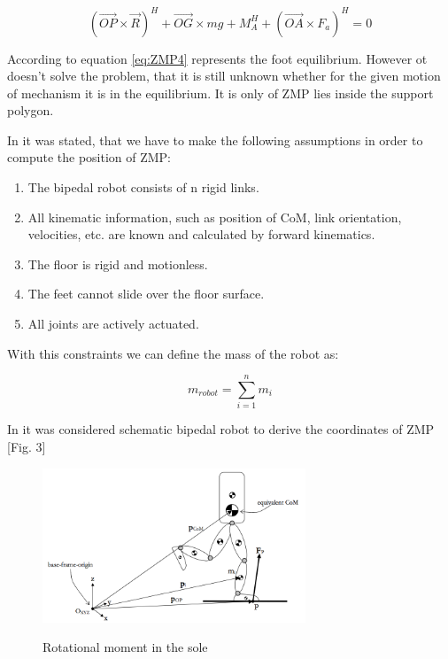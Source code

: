 \documentclass[12pt,a4paper]{report}
\begin{document}
		\begin{equation}\label{eq:ZMP4}
			(\vec{OP} \times \vec{R})^H + \vec{OG} \times mg + M_A^H + (\vec{OA} \times F_a)^H = 0
		\end{equation}

		According to \cite{vukobratovic2004zero} equation \ref{eq:ZMP4} represents the foot equilibrium. However ot doesn't solve the problem, that it is still unknown whether for the given motion of mechanism it is in the equilibrium. It is only of ZMP lies inside the support polygon.
		
		In \cite{dekker2009zero} it was stated, that we have to make the following assumptions in order to compute the position of ZMP:

		\begin{enumerate}
			\item
				The bipedal robot consists of n rigid links.
			\item
				All kinematic information, such as position of CoM, link orientation, velocities, etc. are known and calculated by forward kinematics.
			\item
				The floor is rigid and motionless.
			\item
				The feet cannot slide over the floor surface.
			\item
				All joints are actively actuated.
		\end{enumerate}
	
		With this constraints we can define the mass of the robot as:
	
		\begin{equation}\label{eq:ZMP5}
			m_{robot} = \sum^n_{i=1}{m_i}
		\end{equation}

		In \cite{dekker2009zero} it was considered schematic bipedal robot to derive the coordinates of ZMP [Fig. 3]

		\begin{figure}[h!]
			\vspace{-0.2cm}
			\centering
			{\includegraphics[width=0.7\textwidth]{3}}
			\caption{Rotational moment in the sole \cite{dekker2009zero}}
			\label{fig:3}
			\vspace{-0.1cm}
		\end{figure}
\end{document}
